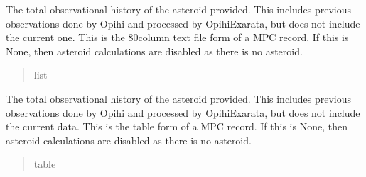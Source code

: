 \documentclass[letterpaper,11pt,english]{sphinxmanual}
\begin{document}
\begin{savenotes}
\begin{fulllineitems}
\begin{savenotes}
\begin{fulllineitems}
\begin{quote}
\begin{description}
\end{description}\end{quote}

\end{fulllineitems}\end{savenotes}


\begin{savenotes}\begin{fulllineitems}
\label{\detokenize{code/opihiexarata.opihi.solution:opihiexarata.opihi.solution.OpihiSolution.asteroid_history}}
\pysigstartsignatures
{}
\pysigstopsignatures
\sphinxAtStartPar
The total observational history of the asteroid provided. This includes
previous observations done by Opihi and processed by OpihiExarata, but
does not include the current one. This is the 80\sphinxhyphen{}column text file
form of a MPC record. If this is None, then asteroid calculations are
disabled as there is no asteroid.
\begin{quote}\begin{description}
\sphinxAtStartPar
list

\end{description}\end{quote}

\end{fulllineitems}\end{savenotes}


\begin{savenotes}\begin{fulllineitems}
\label{\detokenize{code/opihiexarata.opihi.solution:opihiexarata.opihi.solution.OpihiSolution.asteroid_observations}}
\pysigstartsignatures
{}
\pysigstopsignatures
\sphinxAtStartPar
The total observational history of the asteroid provided. This includes
previous observations done by Opihi and processed by OpihiExarata, but
does not include the current data. This is the table form of a MPC
record. If this is None, then asteroid calculations are disabled as
there is no asteroid.
\begin{quote}\begin{description}
\sphinxAtStartPar
table


\end{description}
\end{quote}
\end{fulllineitems}
\end{savenotes}
\end{fulllineitems}
\end{savenotes}
\end{document}
